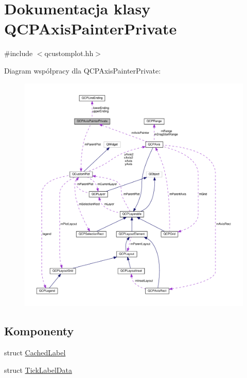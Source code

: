 \hypertarget{class_q_c_p_axis_painter_private}{}\section{Dokumentacja klasy Q\+C\+P\+Axis\+Painter\+Private}
\label{class_q_c_p_axis_painter_private}


{\ttfamily \#include $<$qcustomplot.\+hh$>$}



Diagram współpracy dla Q\+C\+P\+Axis\+Painter\+Private\+:\nopagebreak
\begin{figure}[H]
\begin{center}
\leavevmode
\includegraphics[width=350pt]{class_q_c_p_axis_painter_private__coll__graph}
\end{center}
\end{figure}
\subsection*{Komponenty}
\begin{DoxyCompactItemize}
\item 
struct \hyperlink{struct_q_c_p_axis_painter_private_1_1_cached_label}{Cached\+Label}
\item 
struct \hyperlink{struct_q_c_p_axis_painter_private_1_1_tick_label_data}{Tick\+Label\+Data}
\end{DoxyCompactItemize}
